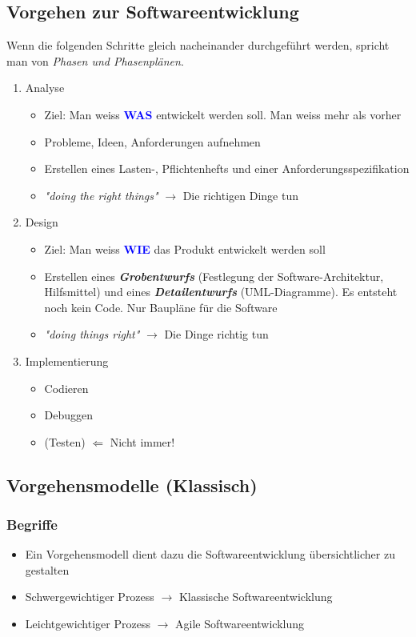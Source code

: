\subsection{Vorgehen zur Softwareentwicklung}
Wenn die folgenden Schritte gleich nacheinander durchgeführt werden, spricht man von \textit{Phasen und Phasenplänen}.
	\begin{enumerate}
		\item Analyse
			\begin{itemize}
				\item Ziel: Man weiss \textbf{\textcolor{blue}{WAS}} entwickelt werden soll.
                \subitem \rightarrow Man weiss mehr als vorher
				\item Probleme, Ideen, Anforderungen aufnehmen
				\item Erstellen eines Lasten-, Pflichtenhefts und einer Anforderungsspezifikation
				\item \textit{"doing the right things"} $\rightarrow$ Die richtigen Dinge tun
			\end{itemize}
		\item Design
			\begin{itemize}
				\item Ziel: Man weiss \textbf{\textcolor{blue}{WIE}} das Produkt entwickelt werden soll
				\item Erstellen eines \textbf{\textit{Grobentwurfs}} (Festlegung der Software-Architektur, Hilfsmittel) und \newline eines \textbf{\textit{Detailentwurfs}} (UML-Diagramme). Es entsteht noch kein Code. Nur Baupläne für die Software
				\item \textit{"doing things right"} $\rightarrow$ Die Dinge richtig tun
			\end{itemize}
		\item Implementierung
			\begin{itemize}
				\item Codieren
				\item Debuggen
				\item (Testen) $\Leftarrow$ Nicht immer!
			\end{itemize}
	\end{enumerate}

\subsection{Vorgehensmodelle (Klassisch)}
\subsubsection{Begriffe}
\begin{itemize}
	\item Ein Vorgehensmodell dient dazu die Softwareentwicklung übersichtlicher zu gestalten
	\item Schwergewichtiger Prozess $\rightarrow$ Klassische Softwareentwicklung
	\item Leichtgewichtiger Prozess $\rightarrow$ Agile Softwareentwicklung
\end{itemize}

